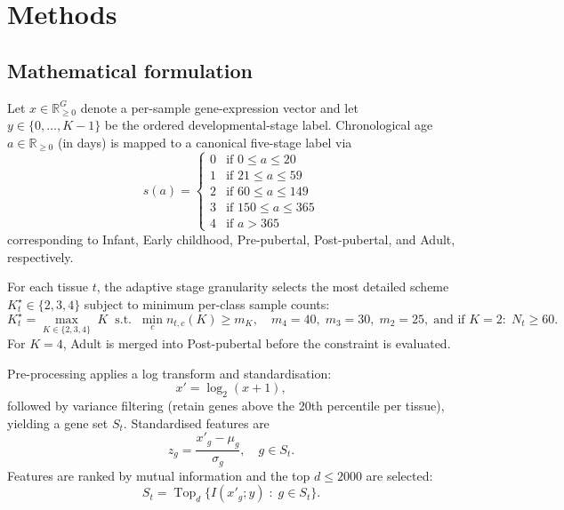 \documentclass[11pt]{article}
\begin{document}
\section{Methods}

\subsection{Mathematical formulation}
Let $x \in \mathbb{R}^G_{\ge 0}$ denote a per-sample gene-expression vector and let $y \in \{0,\dots,K-1\}$ be the ordered developmental-stage label. Chronological age $a \in \mathbb{R}_{\ge 0}$ (in days) is mapped to a canonical five-stage label via
\begin{equation}
s(a) =
\begin{cases}
0 & \text{if } 0 \le a \le 20 \\
1 & \text{if } 21 \le a \le 59 \\
2 & \text{if } 60 \le a \le 149 \\
3 & \text{if } 150 \le a \le 365 \\
4 & \text{if } a > 365
\end{cases}
\label{eq:age2stage}
\end{equation}
corresponding to Infant, Early childhood, Pre-pubertal, Post-pubertal, and Adult, respectively.

For each tissue $t$, the adaptive stage granularity selects the most detailed scheme $K_t^\star \in \{2,3,4\}$ subject to minimum per-class sample counts:
\begin{equation}
K_t^\star = \max_{K \in \{2,3,4\}} \; K \;\; \text{s.t.} \;\; \min_c n_{t,c}(K) \ge m_K,\quad m_4{=}40,\; m_3{=}30,\; m_2{=}25,\;\text{and if } K{=}2:\; N_t \ge 60.
\label{eq:schema}
\end{equation}
For $K{=}4$, Adult is merged into Post-pubertal before the constraint is evaluated.

Pre-processing applies a log transform and standardisation:
\begin{equation}
x' = \log_2(x + 1),
\label{eq:preprocess}
\end{equation}
followed by variance filtering (retain genes above the 20th percentile per tissue), yielding a gene set $S_t$. Standardised features are
\begin{equation}
z_g = \frac{x'_g - \mu_g}{\sigma_g}, \quad g \in S_t.
\label{eq:standardize}
\end{equation}
Features are ranked by mutual information and the top $d \le 2000$ are selected:
\begin{equation}
S_t = \operatorname{Top}_d \big\{ I(x'_g; y) \;:\; g \in S_t \big\}.
\label{eq:mi}
\end{equation}
\end{document}
